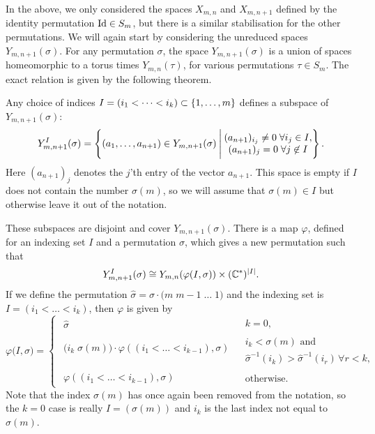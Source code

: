 In the above, we only considered the spaces $X_{m,n}$ and $X_{m,n+1}$
defined by the identity permutation $\operatorname{Id}\in S_m$,
but there is a similar stabilisation for the other permutations. We
will again start by considering the unreduced spaces
$Y_{m,n+1}(\sigma)$. For
any permutation $\sigma$, the space $Y_{m,n+1}(\sigma)$ is a union of
spaces homeomorphic to a torus times $Y_{m,n}(\tau)$, for various
permutations $\tau\in S_m$. The exact relation is given by the
following theorem.

\begin{theorem}
  \label{thm:permutation}
  Any choice of indices $I= (i_1<\dots<i_k) \subset \left\{ 1,\dots,m \right\}$
  defines a subspace of $Y_{m,n+1}(\sigma)$:
  \[ Y_{m,n+1}^I(\sigma) = \left\{ (a_1,\dots,a_{n+1}) \in
    Y_{m,n+1}(\sigma) \:\Bigg\vert\: 
    \begin{matrix} 
      (a_{n+1})_{i_j} \neq 0\; \forall i_j \in I, \\
      (a_{n+1})_j = 0 \;\forall j \not\in I
    \end{matrix}  \right\}. \]
  Here $(a_{n+1})_j$ denotes the $j$'th entry of the vector $a_{n+1}$.
  This space is empty if $I$ does not contain the number $\sigma(m)$,
  so we will assume that $\sigma(m) \in I$ but otherwise leave it out
  of the notation.
  
  These subspaces are disjoint and cover $Y_{m,n+1}(\sigma)$. There is
  a map $\varphi$,
  defined for an indexing set $I$ and a permutation $\sigma$, which
  gives a new permutation such that
  \[ Y_{m,n+1}^I(\sigma) \cong Y_{m,n}(\varphi(I,\sigma)) \times
  (\mathbb{C}^*)^{\left| I \right|}. \]
  If we define the permutation $\widehat \sigma = \sigma \cdot
  \big(m\; m-1\; \dots \; 1\big)$ and the indexing set is ${I = (i_1 <
    \dots < i_k)}$, then $\varphi$ is given by
  \[ \varphi\big(I,\sigma\big) = 
  \begin{cases}
    \begin{matrix} \widehat\sigma \end{matrix} & 
    \begin{array}{l} k = 0, \end{array} \\
    \begin{matrix}
      \big( i_k\; \sigma(m) \big) \cdot \varphi\left( (i_1 < \dots <
        i_{k-1}),\sigma\right) \\
    \end{matrix} &
    \begin{array}{l} i_k < \sigma(m) \text{ and } \\
      \widehat\sigma^{-1}(i_k) > \widehat\sigma^{-1}(i_r) \,
      \forall r < k,\end{array}\\
    \begin{matrix}
      \varphi\left( (i_1 < \dots < i_{k-1}),\sigma\right)
    \end{matrix} &
    \begin{array}{l} \text{otherwise}. \end{array}
  \end{cases} \]
  Note that the index $\sigma(m)$ has once again been removed from the
  notation, 
  so the $k = 0$ case is really $I = (\sigma(m))$ and $i_k$
  is the last index not equal to $\sigma(m)$.
\end{theorem}

